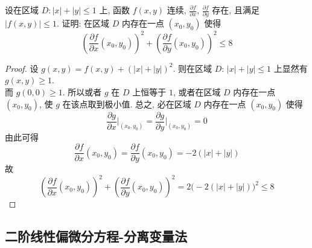\documentclass[color=green,titlestyle=hang]{elegantbook}%
\begin{document}
\begin{example}
设在区域 $D: |x|+|y|\leqslant1$ 上, 函数 $f(x,y)$ 连续, $\frac{\partial f}{\partial x}$, $\frac{\partial f}{\partial y}$ 存在, 且满足 $|f(x,y)|\leqslant1$. 证明: 在区域 $D$ 内存在一点 $(x_0,y_0)$ 使得
\[\left(\frac{\partial f}{\partial x}(x_0,y_0)\right)^2+\left(\frac{\partial f}{\partial y}(x_0,y_0)\right)^2\leqslant8\]
\end{example}\begin{proof}
设 $g(x,y)=f(x,y)+(|x|+|y|)^2$. 则在区域 $D:\,|x|+|y|\leqslant1$ 上显然有 $g(x,y)\geqslant1$. \\
而 $g(0,0)\geqslant1$. 所以或者 $g$ 在 $D$ 上恒等于 $1$, 或者在区域 $D$ 内存在一点 $(x_0,y_0)$, 使 $g$ 在该点取到极小值. 总之, 必在区域 $D$ 内存在一点 $(x_0,y_0)$ 使得
\[\frac{\partial g}{\partial x}\bigg|_{(x_0,y_0)}=\frac{\partial g}{\partial y}\bigg|_{(x_0,y_0)}=0\]
由此可得\[\frac{\partial f}{\partial x}(x_0,y_0)=\frac{\partial f}{\partial y}(x_0,y_0)=-2(|x|+|y|)\]
故\[\left(\frac{\partial f}{\partial x}(x_0,y_0)\right)^2+\left(\frac{\partial f}{\partial y}(x_0,y_0)\right)^2=2\big(-2(|x|+|y|)\big)^2\leqslant8\]
\end{proof}

\subsection{二阶线性偏微分方程-分离变量法}



\end{document}
